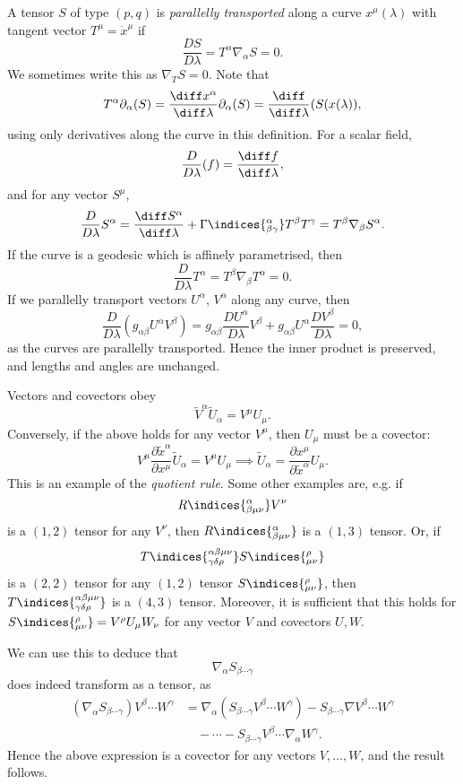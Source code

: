 \documentclass[12pt]{article}
\begin{document}
A tensor $S$ of type $(p, q)$ is \emph{parallelly transported} along a curve $x^\mu(\lambda)$ with tangent vector $T^\mu = \dot x^\mu$ if
\[
\frac{DS}{D\lambda} = T^\alpha \nabla_\alpha S = 0.
\]
We sometimes write this as $\nabla_T S = 0$. Note that
\[
T^\alpha \partial_\alpha(S) = \frac{\diff x^\alpha}{\diff \lambda} \partial_\alpha (S) = \frac{\diff}{\diff \lambda} (S(x(\lambda)),
\]
using only derivatives along the curve in this definition. For a scalar field,
\[
\frac{D}{D \lambda} (f) = \frac{\diff f}{\diff \lambda},
\]
and for any vector $S^\mu$,
\[
	\frac{D}{D \lambda} S^\alpha = \frac{\diff S^\alpha}{\diff \lambda} + \Gamma\indices{^\alpha_{\beta\gamma}} T^\beta T^\gamma = T^\beta \nabla_\beta S^\alpha.
\]
If the curve is a geodesic which is affinely parametrised, then
\[
\frac{D}{D \lambda} T^\alpha = T^\beta \nabla_\beta T^\alpha = 0.
\]
If we parallelly transport vectors $U^\alpha$, $V^\alpha$ along any curve, then
\[
	\frac{D}{D \lambda}(g_{\alpha\beta} U^\alpha V^\beta) = g_{\alpha\beta} \frac{DU^\alpha}{D\lambda} V^\beta + g_{\alpha\beta} U^\alpha \frac{DV^\beta}{D\lambda} = 0,
\]
as the curves are parallelly transported. Hence the inner product is preserved, and lengths and angles are unchanged.

Vectors and covectors obey
\[
\tilde V^\alpha \tilde U_\alpha = V^\mu U_\mu.
\]
Conversely, if the above holds for any vector $V^\mu$, then $U_\mu$ must be a covector:
\[
	V^\mu \frac{\partial \tilde x^\alpha}{\partial x^\mu} \tilde U_\alpha = V^\mu U_\mu \implies \tilde U_\alpha = \frac{\partial x^\mu}{\partial \tilde x^\alpha} U_\mu.
\]
This is an example of the \emph{quotient rule}. Some other examples are, e.g. if
\[
	R\indices{^\alpha_{\beta\mu\nu}} V^\nu
\]
is a $(1, 2)$ tensor for any $V^\nu$, then $R\indices{^\alpha_{\beta\mu\nu}}$ is a $(1, 3)$ tensor. Or, if
\[
	T\indices{^{\alpha\beta\mu\nu}_{\gamma\delta\rho}} S\indices{^{\rho}_{\mu\nu}}
\]
is a $(2, 2)$ tensor for any $(1, 2)$ tensor $S\indices{^\rho_{\mu\nu}}$, then $T\indices{^{\alpha\beta\mu\nu}_{\gamma\delta\rho}}$ is a $(4, 3)$ tensor. Moreover, it is sufficient that this holds for $S\indices{^\rho_{\mu\nu}} = V^\rho U_\mu W_\nu$ for any vector $V$ and covectors $U, W$.

\begin{exbox}
	We can use this to deduce that
	\[
	\nabla_\alpha S_{\beta \cdots \gamma}
	\]
	does indeed transform as a tensor, as
	\begin{align*}
		(\nabla_\alpha S_{\beta \cdots \gamma}) V^\beta \cdots W^\gamma &= \nabla_\alpha(S_{\beta \cdots \gamma}V^\beta \cdots W^\gamma ) - S_{\beta \cdots \gamma} \nabla V^\beta \cdots W^\gamma \\
										& \quad - \cdots - S_{\beta \cdots \gamma} V^\beta \cdots \nabla_\alpha W^\gamma.
	\end{align*}
	Hence the above expression is a covector for any vectors $V, \ldots, W$, and the result follows.
\end{exbox}
\end{document}
